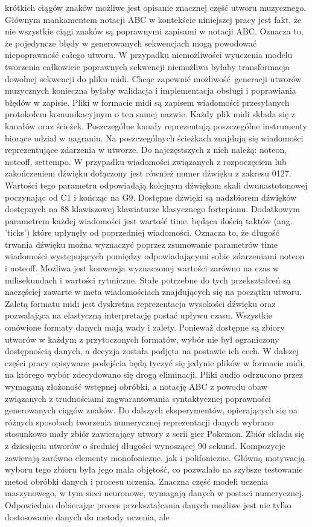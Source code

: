 krótkich ciągów znaków możliwe jest opisanie znacznej część utworu muzycznego. Głównym mankamentem notacji ABC w kontekście niniejszej pracy jest fakt, że nie wszystkie ciągi znaków są poprawnymi zapisami  w notacji ABC. Oznacza to, że pojedyncze błędy w generowanych sekwencjach mogą powodować niepoprawność całego utworu. W przypadku niemożliwości wyuczenia modelu tworzenia całkowicie poprawnych sekwencji niemożliwa byłaby transformacja dowolnej sekwencji do pliku midi. Chcąc zapewnić możliwość generacji utworów muzycznych konieczna byłaby walidacja i implementacja obsługi i poprawiania błędów w zapisie. Pliki w formacie midi są zapisem wiadomości przesyłanych protokołem komunikacyjnym o ten samej nazwie. Każdy plik midi składa się z kanałów oraz ścieżek. Poszczególne kanały reprezentują poszczególne instrumenty biorące udział w nagraniu. Na poszczególnych ścieżkach znajdują się wiadomości reprezentujące zdarzenia w utworze. Do najczęstszych z nich należą: note\textunderscore on, note\textunderscore off, set\textunderscore tempo. W przypadku wiadomości związanych z rozpoczęciem lub zakończeniem dźwięku dołączony jest również numer dźwięku z zakresu 0127.  Wartości tego parametru odpowiadają kolejnym dźwiękom skali dwunastotonowej poczynając od C1 i kończąc na G9. Dostępne dźwięki są nadzbiorem dźwięków dostępnych na 88 klawiszowej klawiaturze klasycznego fortepianu. Dodatkowym parametrem każdej wiadomości jest wartość time, będąca ilością taktów (ang. 'ticks') które upłynęły od poprzedniej wiadomości. Oznacza to, że długość trwania dźwięku można wyznaczyć poprzez zsumowanie parametrów time wiadomości występujących pomiędzy odpowiadającymi sobie zdarzeniami note\textunderscore on i note\textunderscore off. Możliwa jest konwersja wyznaczonej wartości zarówno na czas w milisekundach i wartości rytmiczne. Stałe potrzebne do tych przekształceń są naczęściej zawarte w meta wiadomościach znajdujących się na początku utworu. Zaletą formatu midi jest dyskretna reprezentacja wysokości dźwięku oraz pozwalająca na elastyczną  interpretację postać upływu czasu. Wszystkie omówione formaty danych mają wady i zalety.  Ponieważ dostępne są zbiory utworów w każdym z przytoczonych formatów, wybór nie był ograniczony dostępnością danych,  a decyzja została podjęta na postawie ich cech. W dalszej części pracy opisywane podejścia będą tyczyć się jedynie plików w formacie midi, na którego  wybór zdecydowano się drogą eliminacji. Pliki audio odrzucono przez wymaganą złożoność wstępnej obróbki, a notację ABC z powodu obaw związanych z trudnościami zagwarantowania syntaktycznej poprawności  generowanych ciągów znaków. Do dalszych eksperymentów, opierających się na różnych sposobach tworzenia numerycznej reprezentacji danych wybrano stosunkowo mały zbiór zawierający utwory z serii gier Pokemon. Zbiór składa się z dziesięciu utworów o średniej długości wynoszącej 90 sekund. Kompozycje zawierają zarówno  elementy monofoniczne, jak i polifoniczne. Główną motywacją wyboru tego zbioru była jego mała objętość, co pozwalało na szybsze testowanie metod obróbki danych i procesu uczenia. Znaczna część modeli uczenia maszynowego, w tym sieci neuronowe, wymagają  danych w postaci numerycznej. Odpowiednio dobierając proces przekształcania danych możliwe jest nie tylko dostosowanie danych do metody uczenia, ale 